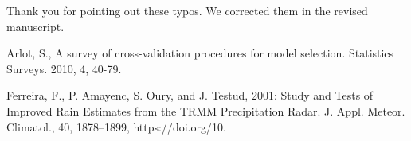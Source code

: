 \documentclass[12pt]{article}
\begin{document}
\noindent Thank you for pointing out these typos. We corrected them in the revised manuscript.\\

\begin{thebibliography}{999}

Arlot, S., A survey of cross-validation procedures for model selection. Statistics Surveys. 2010, 4, 40-79.


Ferreira, F., P. Amayenc, S. Oury, and J. Testud, 2001: Study and Tests of Improved Rain Estimates from the TRMM Precipitation Radar. 
J. Appl. Meteor. Climatol., 40, 1878–1899, https://doi.org/10. 

\end{thebibliography}
\end{document}
